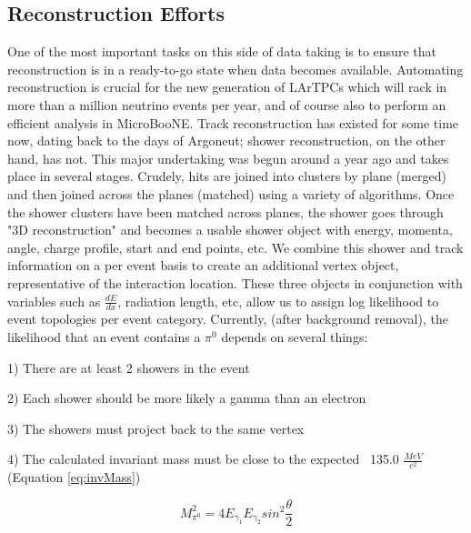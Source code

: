 \documentclass[12pt]{article}
\begin{document}
\subsection{Reconstruction Efforts}
One of the most important tasks on this side of data taking is to ensure that reconstruction is in a ready-to-go state when data becomes available. Automating reconstruction is crucial for the new generation of LArTPCs which will rack in more than a million neutrino events per year, and of course also to perform an efficient analysis in MicroBooNE.  Track reconstruction has existed for some time now, dating back to the days of Argoneut; shower reconstruction, on the other hand, has not. This major undertaking was begun around a year ago and takes place in several stages. Crudely, hits are joined into clusters by plane (merged) and then joined across the planes (matched) using a variety of algorithms.  Once the shower clusters have been matched across planes, the shower goes through "3D reconstruction" and becomes a usable shower object with energy, momenta, angle, charge profile, start and end points, etc.  We combine this shower and track information on a per event basis to create an additional vertex object, representative of the interaction location.  These three objects in conjunction with variables such as $\frac{dE}{dx}$, radiation length, etc, allow us to assign log likelihood to event topologies per event category. Currently, (after background removal), the likelihood that an event contains a $\pi^0$ depends on several things: 
\vspace{3 mm}
\par1) There are at least 2 showers in the event
\par2) Each shower should be more likely a gamma than an electron
\par3) The showers must project back to the same vertex
\par4) The calculated invariant mass must be close to the expected ~135.0 $\frac{MeV}{c^2}$ (Equation \ref{eq:invMass}) 

\begin{equation} \label{eq:invMass}
 M^2_{\pi^0} = 4 E_{\gamma_1} E_{\gamma_2} sin^2\frac{\theta}{2}
 \end{equation}
\end{document}
